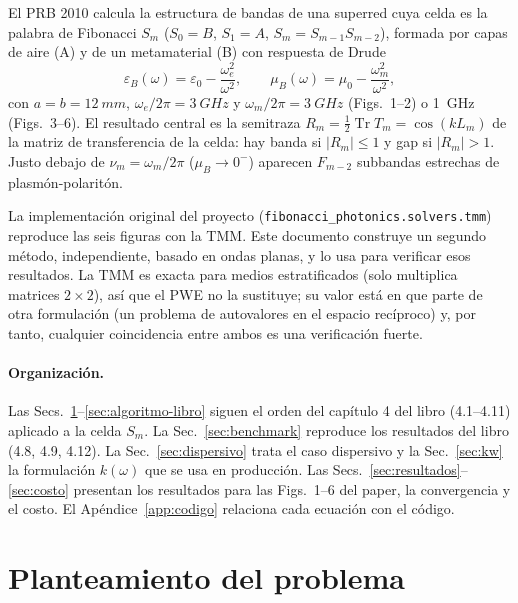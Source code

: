 \documentclass[11pt,a4paper]{article}
\newcommand{\code}[1]{\texttt{#1}}
\begin{document}
El PRB 2010 calcula la estructura de bandas de una superred cuya celda es la
palabra de Fibonacci $S_m$ ($S_0=B$, $S_1=A$, $S_{m}=S_{m-1}S_{m-2}$), formada por
capas de aire (A) y de un metamaterial (B) con respuesta de Drude
\begin{equation}
\varepsilon_B(\omega)=\varepsilon_0-\frac{\omega_e^2}{\omega^2},\qquad
\mu_B(\omega)=\mu_0-\frac{\omega_m^2}{\omega^2},
\label{eq:drude}
\end{equation}
con $a=b=\SI{12}{mm}$, $\omega_e/2\pi=\SI{3}{GHz}$ y
$\omega_m/2\pi=\SI{3}{GHz}$ (Figs.~1--2) o \SI{1}{GHz} (Figs.~3--6). El
resultado central es la semitraza $R_m=\tfrac12\operatorname{Tr}T_m=\cos(kL_m)$
de la matriz de transferencia de la celda: hay banda si $|R_m|\le 1$ y gap si
$|R_m|>1$. Justo debajo de $\nu_m=\omega_m/2\pi$ ($\mu_B\to 0^-$) aparecen
$F_{m-2}$ subbandas estrechas de plasmón-polaritón.

La implementación original del proyecto (\code{fibonacci\_photonics.solvers.tmm})
reproduce las seis figuras con la TMM. Este documento construye un segundo
método, independiente, basado en ondas planas, y lo usa para verificar esos
resultados. La TMM es exacta para medios estratificados (solo multiplica
matrices $2\times2$), así que el PWE no la sustituye; su valor está en que parte
de otra formulación (un problema de autovalores en el espacio recíproco) y, por
tanto, cualquier coincidencia entre ambos es una verificación fuerte.

\paragraph{Organización.} Las Secs.~\ref{sec:problema}--\ref{sec:algoritmo-libro}
siguen el orden del capítulo 4 del libro (4.1--4.11) aplicado a la celda $S_m$.
La Sec.~\ref{sec:benchmark} reproduce los resultados del libro (4.8, 4.9, 4.12).
La Sec.~\ref{sec:dispersivo} trata el caso dispersivo y la
Sec.~\ref{sec:kw} la formulación $k(\omega)$ que se usa en producción.
Las Secs.~\ref{sec:resultados}--\ref{sec:costo} presentan los resultados para
las Figs.~1--6 del paper, la convergencia y el costo. El
Apéndice~\ref{app:codigo} relaciona cada ecuación con el código.

\section{Planteamiento del problema}\label{sec:problema}
\end{document}
